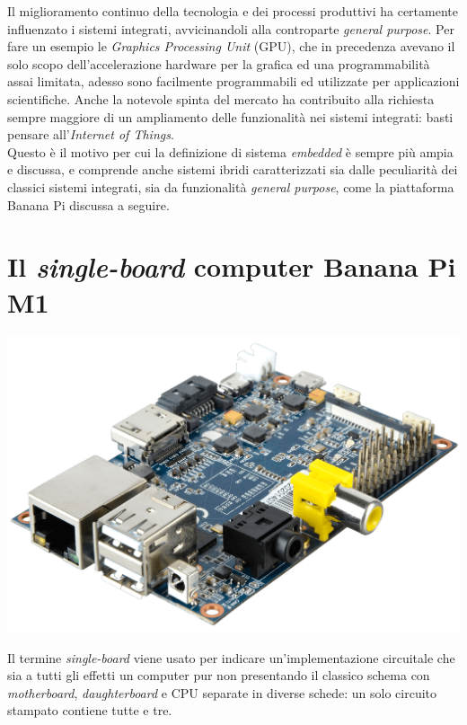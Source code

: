 Il miglioramento continuo della tecnologia e dei processi produttivi ha 
certamente influenzato i sistemi integrati, avvicinandoli alla controparte 
\emph{general purpose}. Per fare un esempio le \emph{Graphics Processing Unit} 
(GPU), 
che in precedenza avevano il solo 
scopo dell'accelerazione hardware per la grafica ed una programmabilità assai 
limitata, adesso sono facilmente programmabili ed utilizzate per applicazioni 
scientifiche. Anche la notevole spinta del mercato ha 
contribuito alla richiesta sempre maggiore di un ampliamento delle 
funzionalità nei sistemi integrati: basti pensare all'\emph{Internet of 
Things}. \\
Questo è il motivo per cui la definizione di sistema \emph{embedded} è sempre 
più ampia e discussa, e comprende anche sistemi ibridi caratterizzati sia 
dalle peculiarità dei classici sistemi integrati, sia da funzionalità 
\emph{general purpose}, come la piattaforma Banana Pi discussa a seguire.

\newpage
\section{Il \emph{single-board} computer Banana Pi M1}
\begin{center}
\includegraphics[scale=0.175]{Figures/bananapi.png}\\
\end{center}
Il termine \emph{single-board} viene usato per indicare un'implementazione 
circuitale che sia a tutti gli effetti un computer pur non presentando il 
classico schema con \emph{motherboard}, \emph{daughterboard} e CPU separate in 
diverse schede: un solo circuito stampato contiene tutte e tre.


